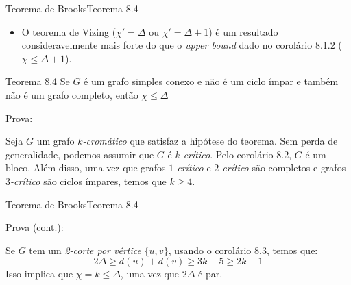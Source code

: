 \documentclass{beamer}
\begin{document}
\begin{frame}{Teorema de Brooks}{Teorema 8.4}

    \begin{itemize}
          \item O teorema de Vizing ($\chi' = \Delta$ ou $\chi' = \Delta+1$) é um resultado consideravelmente mais forte do que o \textit{upper bound} dado no corolário 8.1.2 ($\chi \leq \Delta+1$).
    \end{itemize}
    
    
    \begin{alertblock}{Teorema 8.4}
       Se $G$ é um grafo simples conexo e não é um ciclo ímpar e também não é um grafo completo, então $\chi \leq \Delta$
       
    \end{alertblock}
    \vskip 0.2cm
    \begin{block}{Prova:}
        \begin{sloppypar}
            \justifying
            Seja $G$ um grafo $k$\textit{-cromático} que satisfaz a hipótese do teorema. Sem perda de generalidade, podemos assumir que $G$ é $k$\textit{-crítico}. Pelo corolário 8.2, $G$ é um bloco. Além disso, uma vez que grafos $1$\textit{-crítico} e $2$\textit{-crítico} são completos e grafos $3$\textit{-crítico} são ciclos ímpares, temos que $k \geq 4$. 
            
        \end{sloppypar}
    \end{block}
        
\end{frame}


\begin{frame}{Teorema de Brooks}{Teorema 8.4}

    
    \begin{block}{Prova (cont.):}
        \begin{sloppypar}
            \justifying
            Se $G$ tem um \textit{2-corte por vértice} $\{u,v\}$, usando o corolário 8.3, temos que:
            \begin{equation*}
                2\Delta \geq d(u) + d(v) \geq 3k - 5 \geq 2k - 1
            \end{equation*}
            Isso implica que $\chi = k \leq \Delta$, uma vez que $2\Delta$ é par.
        \end{sloppypar}
    \end{block}
        
\end{frame}
\end{document}
